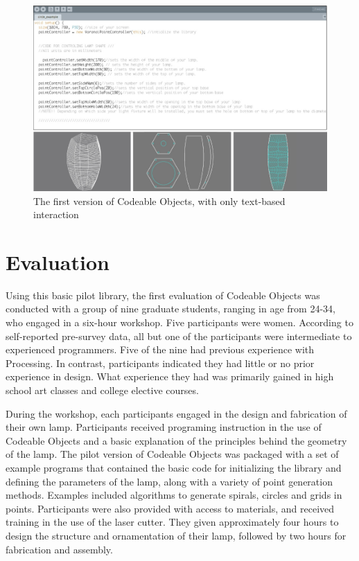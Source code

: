 \begin{center}
\begin{figure}[h!]
\includegraphics[width=6.5in]{images/codeable_objects_v1.jpg}
\caption{The first version of Codeable Objects, with only text-based interaction}
\label{fig:codeable_objects_v1}
\end{figure}
\end{center}
		
\section{Evaluation}
Using this basic pilot library, the first evaluation of Codeable Objects was conducted with a group of nine graduate students, ranging in age from 24-34, who engaged in a six-hour workshop. Five participants were women.  According to self-reported pre-survey data, all but one of the participants were intermediate to experienced programmers. Five of the nine had previous experience with Processing. In contrast, participants indicated they had little or no prior experience in design.  What experience they had was primarily gained in high school art classes and college elective courses. 

During the workshop, each participants engaged in the design and fabrication of their own lamp. Participants received programing instruction in the use of Codeable Objects and a basic explanation of the principles behind the geometry of the lamp. The pilot version of Codeable Objects was packaged with a set of example programs that contained the basic code for initializing the library and defining the parameters of the lamp, along with a variety of point generation methods. Examples included algorithms to generate spirals, circles and grids in points. Participants were also provided with access to materials, and received training in the use of the laser cutter. They given approximately four hours to design the structure and ornamentation of their lamp, followed by two hours for fabrication and assembly.

